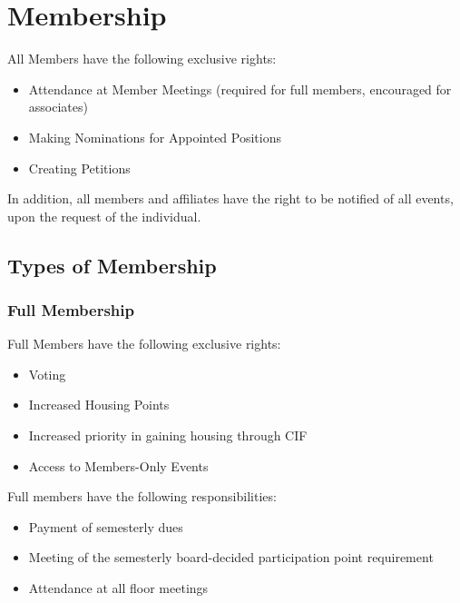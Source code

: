 \section{Membership}
\label{sec:membership}

All Members have the following exclusive rights:

\begin{itemize}
	\item Attendance at Member Meetings (required for full members, encouraged for associates)
	\item Making Nominations for Appointed Positions
	\item Creating Petitions
\end{itemize}

In addition, all members and affiliates have the right to be notified of all events, upon the request of the individual.



	\subsection{Types of Membership}



		\subsubsection{Full Membership}\label{ssub:full-membership}

		Full Members have the following exclusive rights:

		\begin{itemize}
			\item Voting
			\item Increased Housing Points
			\item Increased priority in gaining housing through CIF
			\item Access to Members-Only Events
		\end{itemize}

		Full members have the following responsibilities:

		\begin{itemize}
			\item Payment of semesterly dues
			\item Meeting of the semesterly board-decided participation point requirement
			\item Attendance at all floor meetings
		\end{itemize}

